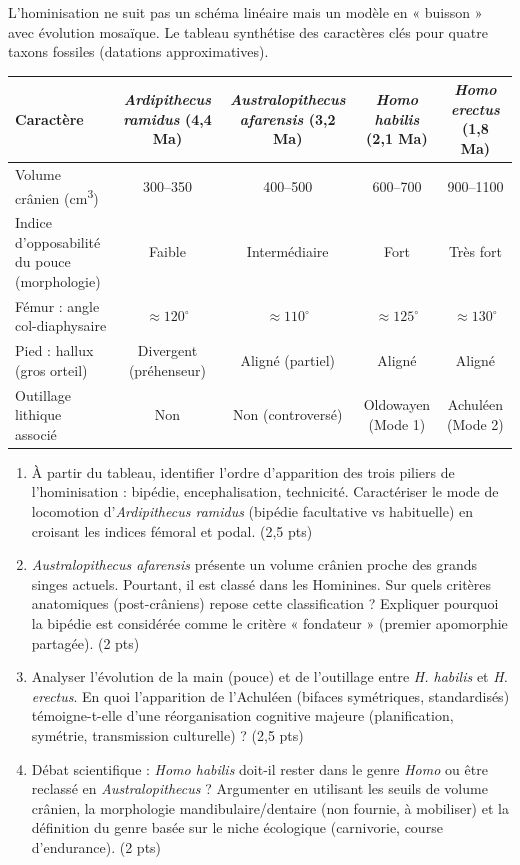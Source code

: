 \documentclass[11pt]{article}
\begin{document}
\begin{exercice}
L'hominisation ne suit pas un schéma linéaire mais un modèle en « buisson » avec évolution mosaïque. Le tableau synthétise des caractères clés pour quatre taxons fossiles (datations approximatives).

\begin{center}
\begin{tabular}{|l|c|c|c|c|}
\hline
Caractère & \textit{Ardipithecus ramidus} (4,4 Ma) & \textit{Australopithecus afarensis} (3,2 Ma) & \textit{Homo habilis} (2,1 Ma) & \textit{Homo erectus} (1,8 Ma) \\
\hline
Volume crânien (\si{cm^3}) & 300--350 & 400--500 & 600--700 & 900--1100 \\
Indice d'opposabilité du pouce (morphologie) & Faible & Intermédiaire & Fort & Très fort \\
Fémur : angle col-diaphysaire & $\approx 120^\circ$ & $\approx 110^\circ$ & $\approx 125^\circ$ & $\approx 130^\circ$ \\
Pied : hallux (gros orteil) & Divergent (préhenseur) & Aligné (partiel) & Aligné & Aligné \\
Outillage lithique associé & Non & Non (controversé) & Oldowayen (Mode 1) & Achuléen (Mode 2) \\
\hline
\end{tabular}
\end{center}

\begin{enumerate}
    \item À partir du tableau, identifier l'ordre d'apparition des trois piliers de l'hominisation : bipédie, encephalisation, technicité. Caractériser le mode de locomotion d'\textit{Ardipithecus ramidus} (bipédie facultative vs habituelle) en croisant les indices fémoral et podal. (2,5 pts)
    \item \textit{Australopithecus afarensis} présente un volume crânien proche des grands singes actuels. Pourtant, il est classé dans les Hominines. Sur quels critères anatomiques (post-crâniens) repose cette classification ? Expliquer pourquoi la bipédie est considérée comme le critère « fondateur » (premier apomorphie partagée). (2 pts)
    \item Analyser l'évolution de la main (pouce) et de l'outillage entre \textit{H. habilis} et \textit{H. erectus}. En quoi l'apparition de l'Achuléen (bifaces symétriques, standardisés) témoigne-t-elle d'une réorganisation cognitive majeure (planification, symétrie, transmission culturelle) ? (2,5 pts)
    \item Débat scientifique : \textit{Homo habilis} doit-il rester dans le genre \textit{Homo} ou être reclassé en \textit{Australopithecus} ? Argumenter en utilisant les seuils de volume crânien, la morphologie mandibulaire/dentaire (non fournie, à mobiliser) et la définition du genre basée sur le niche écologique (carnivorie, course d'endurance). (2 pts)
\end{enumerate}
\end{exercice}
\end{document}
